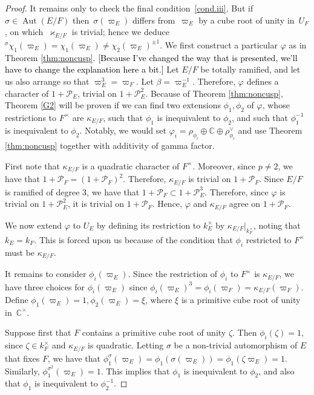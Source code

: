 \documentclass[12pt]{amsart}
\newcommand{\BC}{\mathbb {C}}
\newcommand{\Aut}{\operatorname{Aut}}
\def\shaun#1{\textcolor{black}{#1}}
\begin{document}
\begin{proof}
It remains only to check the final condition~\ref{cond.iii}. But if~$\sigma\in\Aut(E/F)$ then~$\sigma(\varpi_E)$ differs from~$\varpi_E$ by a cube root of unity in~$U_F$, on which~$\varkappa_{E/F}$ is trivial; hence we deduce~${}^\sigma\chi_1(\varpi_E)=\chi_1(\varpi_E) \ne \chi_2(\varpi_E)^{\pm 1}$.
\iffalse
We first construct a particular $\varphi$ as in Theorem \ref{thm:noncusp}.  
\shaun{[Because I've changed the way that is presented, we'll have to change the explanation here a bit.]} 
Let $E/F$ be totally ramified, and let us also arrange so that $\varpi_E^3 = \varpi_F$.  Let $\beta = \varpi_E^{-1}$.  Therefore, $\varphi$ defines a character of $1 + \mathcal{P}_E$, trivial on $1 + \mathcal{P}_E^2$.   Because of Theorem \ref{thm:noncusp}, Theorem \ref{G2} will be proven if we can find two extensions $\phi_1, \phi_2$ of $\varphi$, whose restrictions to $F^{\times}$ are $\kappa_{E/F}$, such that $\phi_1$ is inequivalent to $\phi_2$, and such that $\phi_1^{-1}$ is inequivalent to $\phi_2$.  Notably, we would set $\varphi_i = \rho_{\phi_i} \oplus \mathbb{C} \oplus \rho_{\phi_i}^{\vee}$ and use Theorem \ref{thm:noncusp} together with additivity of gamma factor.

First note that $\kappa_{E/F}$ is a quadratic character of $F^{\times}$.  Moreover, since $p \neq 2$, we have that $1 + \mathcal{P}_F = (1 + \mathcal{P}_F)^2$.  Therefore, $\kappa_{E/F}$ is trivial on $1 + \mathcal{P}_F$.  Since $E/F$ is ramified of degree $3$, we have that $1 + \mathcal{P}_F \subset 1 + \mathcal{P}_E^3$.  Therefore, since $\varphi$ is trivial on $1 + \mathcal{P}_E^2$, it is trivial on $1 + \mathcal{P}_F$.  Hence, $\varphi$ and $\kappa_{E/F}$ agree on $1 + \mathcal{P}_F$.

We now extend $\varphi$ to $U_E$ by defining its restriction to $k_E^{\times}$ by $\kappa_{E/F}|_{k_F^{\times}}$, noting that $k_E = k_F$.  This is forced upon us because of the condition that $\phi_i$ restricted to $F^{\times}$ must be $\kappa_{E/F}$. 

It remains to consider $\phi_i(\varpi_E)$.  Since the restriction of $\phi_i$ to $F^{\times}$ is $\kappa_{E/F}$, we have three choices for $\phi_i(\varpi_E)$ since $\phi_i(\varpi_E)^3 = \phi_i(\varpi_F) = \kappa_{E/F}(\varpi_F)$.  Define $\phi_1(\varpi_E) = 1, \phi_2(\varpi_E) = \xi$, where $\xi$ is a primitive cube root of unity in~$\BC^\times$.  

Suppose first that $F$ contains a primitive cube root of unity $\zeta$.  Then $\phi_i(\zeta) = 1$, since $\zeta \in k_F^{\times}$ and $\kappa_{E/F}$ is quadratic.  Letting $\sigma$ be a non-trivial automorphism of $E$ that fixes $F$, we have that $\phi_1^{\sigma}(\varpi_E) = \phi_1(\sigma(\varpi_E)) = \phi_1( \zeta \varpi_E) = 1$.  Similarly, $\phi_1^{\sigma^2}(\varpi_E) = 1$.  This implies that $\phi_1$ is inequivalent to $\phi_2$, and also that $\phi_1$ is inequivalent to $\phi_2^{-1}$.


\end{proof}
\end{document}
